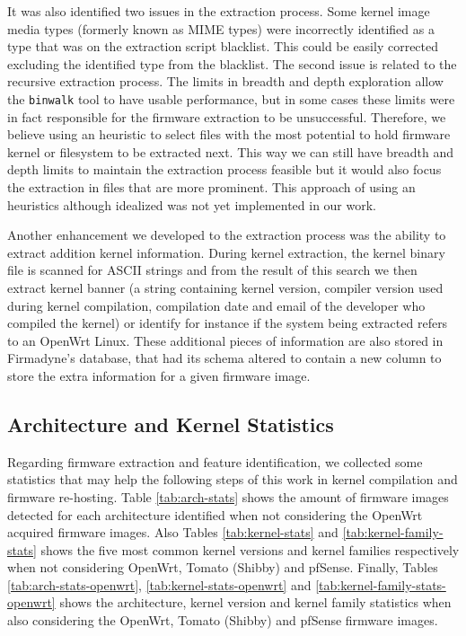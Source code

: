 It was also identified two issues in the extraction process. Some kernel image media types (formerly known as MIME types) were incorrectly identified as a type that was on the extraction script blacklist. This could be easily corrected excluding the identified type from the blacklist. The second issue is related to the recursive extraction process. The limits in breadth and depth exploration allow the {\tt binwalk} tool to have usable performance, but in some cases these limits were in fact responsible for the firmware extraction to be unsuccessful. Therefore, we believe using an heuristic to select files with the most potential to hold firmware kernel or filesystem to be extracted next. This way we can still have breadth and depth limits to maintain the extraction process feasible but it would also focus the extraction in files that are more prominent. This approach of using an heuristics although idealized was not yet implemented in our work.

Another enhancement we developed to the extraction process was the ability to extract addition kernel information. During kernel extraction, the kernel binary file is scanned for ASCII strings and from the result of this search we then extract kernel banner (a string containing kernel version, compiler version used during kernel compilation, compilation date and email of the developer who compiled the kernel) or identify for instance if the system being extracted refers to an OpenWrt Linux. These additional pieces of information are also stored in Firmadyne's \cite{firmadyne} database, that had its schema altered to contain a new column to store the extra information for a given firmware image.


\subsection{Architecture and Kernel Statistics}

Regarding firmware extraction and feature identification, we collected some statistics that may help the following steps of this work in kernel compilation and firmware re-hosting. Table \ref{tab:arch-stats} shows the amount of firmware images detected for each architecture identified when not considering the OpenWrt acquired firmware images. Also Tables \ref{tab:kernel-stats} and \ref{tab:kernel-family-stats} shows the five most common kernel versions and kernel families respectively when not considering OpenWrt, Tomato (Shibby) and pfSense. Finally, Tables \ref{tab:arch-stats-openwrt}, \ref{tab:kernel-stats-openwrt} and \ref{tab:kernel-family-stats-openwrt} shows the architecture, kernel version and kernel family statistics when also considering the OpenWrt, Tomato (Shibby) and pfSense firmware images.

